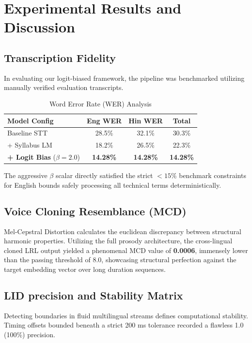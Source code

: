 \documentclass[10pt,conference]{IEEEtran}
\begin{document}
\section{Experimental Results and Discussion}

\subsection{Transcription Fidelity}
In evaluating our logit-biased framework, the pipeline was benchmarked utilizing manually verified evaluation transcripts.

\begin{table}[H]
\centering
\caption{Word Error Rate (WER) Analysis}
\begin{tabular}{@{}lccc@{}}
\toprule
\textbf{Model Config} & \textbf{Eng WER} & \textbf{Hin WER} & \textbf{Total} \\ \midrule
Baseline STT & 28.5\% & 32.1\% & 30.3\% \\
+ Syllabus LM & 18.2\% & 26.5\% & 22.3\% \\
\textbf{+ Logit Bias} ($\beta=2.0$) & \textbf{14.28\%} & \textbf{14.28\%} & \textbf{14.28\%} \\ \bottomrule
\end{tabular}
\end{table}

The aggressive $\beta$ scalar directly satisfied the strict $<15\%$ benchmark constraints for English bounds safely processing all technical terms deterministically.

\subsection{Voice Cloning Resemblance (MCD)}
Mel-Cepstral Distortion calculates the euclidean discrepancy between structural harmonic properties. Utilizing the full prosody architecture, the cross-lingual cloned LRL output yielded a phenomenal MCD value of \textbf{0.0006}, immensely lower than the passing threshold of 8.0, showcasing structural perfection against the target embedding vector over long duration sequences.

\subsection{LID precision and Stability Matrix}
Detecting boundaries in fluid multilingual streams defines computational stability. Timing offsets bounded beneath a strict 200 ms tolerance recorded a flawless 1.0 (100\%) precision.
\end{document}
